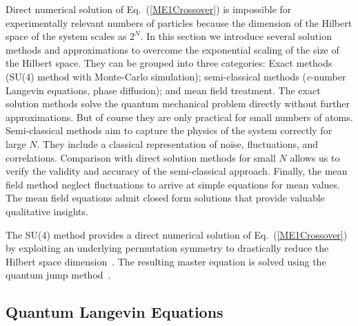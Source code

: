 \documentclass[aps,
twocolumn,
showpacs,
superscriptaddress,groupedaddress]{revtex4}
\begin{document}
Direct numerical solution of Eq.~(\ref{ME1Crossover}) is impossible for
experimentally relevant numbers of particles because the dimension of
the Hilbert space of the system scales as $2^N$.  In this section we
introduce several solution methods and approximations to overcome the
exponential scaling of the size of the Hilbert space.  They can be
grouped into three categories: Exact methods (SU(4) method with
Monte-Carlo simulation); semi-classical methods ({\it c}-number Langevin
equations, phase diffusion); and mean field
treatment.  The exact solution methods solve the quantum mechanical
problem directly without further approximations.  But of course they are
only practical for small numbers of atoms.  Semi-classical methods aim
to capture the physics of the system correctly for large $N$.  They
include a classical representation of noise, fluctuations, and
correlations.  Comparison with direct solution methods for small $N$
allows us to verify the validity and accuracy of the semi-classical
approach.  Finally, the mean field method neglect fluctuations to arrive
at simple equations for mean values.  The mean field equations admit
closed form solutions that provide valuable qualitative insights.

The SU(4) method provides a direct numerical solution of
Eq.~(\ref{ME1Crossover}) by exploiting an underlying permutation
symmetry to drastically reduce the Hilbert space
dimension~\cite{Hartmann:arXiv1201.1732, PhysRevA.87.062101}.  The
resulting master equation is solved using the quantum jump
method~\cite{Dalibard92,Dum92,Knight98}.


\subsection{Quantum Langevin Equations}
\end{document}
